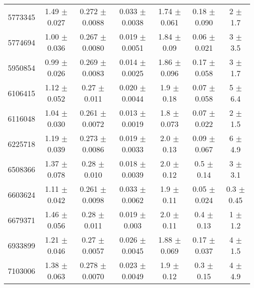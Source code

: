 \begin{table*}
\begin{tabular}{c|cccccc}
5773345  &        1.49   $\pm$  0.027    &        0.272  $\pm$  0.0088   &        0.033  $\pm$  0.0038   &        1.74   $\pm$  0.061    &        0.18   $\pm$  0.090    &        2      $\pm$  1.7      \\
5774694  &        1.00   $\pm$  0.036    &        0.267  $\pm$  0.0080   &        0.019  $\pm$  0.0051   &        1.84   $\pm$  0.09     &        0.06   $\pm$  0.021    &        3      $\pm$  3.5      \\
5950854  &        0.99   $\pm$  0.026    &        0.269  $\pm$  0.0083   &        0.014  $\pm$  0.0025   &        1.86   $\pm$  0.096    &        0.17   $\pm$  0.058    &        3      $\pm$  1.7      \\
6106415  &        1.12   $\pm$  0.052    &        0.27   $\pm$  0.011    &        0.020  $\pm$  0.0044   &        1.9    $\pm$  0.18     &        0.07   $\pm$  0.058    &        5      $\pm$  6.4      \\
6116048  &        1.04   $\pm$  0.030    &        0.261  $\pm$  0.0072   &        0.013  $\pm$  0.0019   &        1.8    $\pm$  0.073    &        0.07   $\pm$  0.022    &        2      $\pm$  1.5      \\
6225718  &        1.19   $\pm$  0.039    &        0.273  $\pm$  0.0086   &        0.019  $\pm$  0.0033   &        2.0    $\pm$  0.13     &        0.09   $\pm$  0.067    &        6      $\pm$  4.9      \\
6508366  &        1.37   $\pm$  0.078    &        0.28   $\pm$  0.010    &        0.018  $\pm$  0.0039   &        2.0    $\pm$  0.12     &        0.5    $\pm$  0.14     &        3      $\pm$  3.1      \\
6603624  &        1.11   $\pm$  0.042    &        0.261  $\pm$  0.0098   &        0.033  $\pm$  0.0062   &        1.9    $\pm$  0.11     &        0.05   $\pm$  0.024    &        0.3    $\pm$  0.45     \\
6679371  &        1.46   $\pm$  0.056    &        0.28   $\pm$  0.011    &        0.019  $\pm$  0.003    &        2.0    $\pm$  0.11     &        0.4    $\pm$  0.13     &        1      $\pm$  1.2      \\
6933899  &        1.21   $\pm$  0.046    &        0.27   $\pm$  0.0057   &        0.026  $\pm$  0.0045   &        1.88   $\pm$  0.069    &        0.17   $\pm$  0.037    &        4      $\pm$  1.5      \\
7103006  &        1.38   $\pm$  0.063    &        0.278  $\pm$  0.0070   &        0.023  $\pm$  0.0049   &        1.9    $\pm$  0.12     &        0.3    $\pm$  0.15     &        4      $\pm$  4.9      \\

\end{tabular}
\end{table*}
